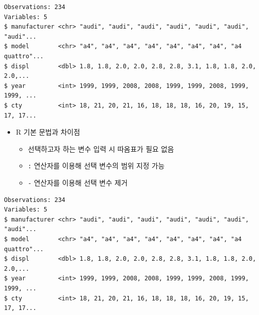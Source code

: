 \documentclass[
  11pt,
]{krantz}
\newenvironment{Shaded}{\begin{snugshade}}{\end{snugshade}}
\newcommand{\CommentTok}[1]{\textcolor[rgb]{0.37,0.37,0.37}{\textit{#1}}}
\newcommand{\KeywordTok}[1]{\textcolor[rgb]{0.27,0.27,0.27}{\textbf{#1}}}
\newcommand{\NormalTok}[1]{#1}
\newcommand{\OperatorTok}[1]{\textcolor[rgb]{0.43,0.43,0.43}{\textbf{#1}}}
\newcommand{\StringTok}[1]{\textcolor[rgb]{0.5,0.5,0.5}{#1}}
\providecommand{\tightlist}{%
  \setlength{\itemsep}{0pt}\setlength{\parskip}{0pt}}
\begin{document}
\begin{verbatim}
Observations: 234
Variables: 5
$ manufacturer <chr> "audi", "audi", "audi", "audi", "audi", "audi", "audi"...
$ model        <chr> "a4", "a4", "a4", "a4", "a4", "a4", "a4", "a4 quattro"...
$ displ        <dbl> 1.8, 1.8, 2.0, 2.0, 2.8, 2.8, 3.1, 1.8, 1.8, 2.0, 2.0,...
$ year         <int> 1999, 1999, 2008, 2008, 1999, 1999, 2008, 1999, 1999, ...
$ cty          <int> 18, 21, 20, 21, 16, 18, 18, 18, 16, 20, 19, 15, 17, 17...
\end{verbatim}

\normalsize

\begin{itemize}
\item
  R 기본 문법과 차이점

  \begin{itemize}
  \tightlist
  \item
    선택하고자 하는 변수 입력 시 따옴표가 필요 없음
  \item
    \texttt{:} 연산자를 이용해 선택 변수의 범위 지정 가능
  \item
    \texttt{-} 연산자를 이용해 선택 변수 제거
  \end{itemize}
\end{itemize}

\footnotesize

\begin{Shaded}
\end{Shaded}

\begin{verbatim}
Observations: 234
Variables: 5
$ manufacturer <chr> "audi", "audi", "audi", "audi", "audi", "audi", "audi"...
$ model        <chr> "a4", "a4", "a4", "a4", "a4", "a4", "a4", "a4 quattro"...
$ displ        <dbl> 1.8, 1.8, 2.0, 2.0, 2.8, 2.8, 3.1, 1.8, 1.8, 2.0, 2.0,...
$ year         <int> 1999, 1999, 2008, 2008, 1999, 1999, 2008, 1999, 1999, ...
$ cty          <int> 18, 21, 20, 21, 16, 18, 18, 18, 16, 20, 19, 15, 17, 17...
\end{verbatim}

\begin{Shaded}
\end{Shaded}
\end{document}
